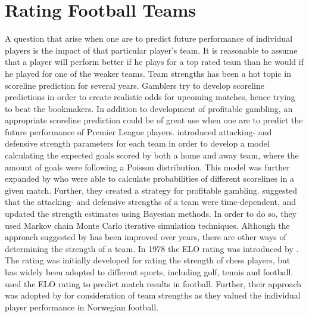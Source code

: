 \section{Rating Football Teams} \label{Strength_of_football_teams} 
\newpar
A question that arise when one are to predict future performance of individual players is the impact of that particular player's team. It is reasonable to assume that a player will perform better if he plays for a top rated team than he would if he played for one of the weaker teams. Team strengths has been a hot topic in scoreline prediction for several years. Gamblers try to develop scoreline predictions in order to create realistic odds for upcoming matches, hence trying to beat the bookmakers. In addition to development of profitable gambling, an appropriate scoreline prediction could be of great use when one are to predict the future performance of Premier League players. 
\newpar
\cite{Maher} introduced attacking- and defensive strength parameters for each team in order to develop a model calculating the expected goals scored by both a home and away team, where the amount of goals were following a Poisson distribution. This model was further expanded by \cite{Dixon} who were able to calculate probabilities of different scorelines in a given match. Further, they created a strategy for profitable gambling. \cite{Rue} suggested that the attacking- and defensive strengths of a team were time-dependent, and updated the strength estimates using Bayesian methods. In order to do so, they used Markov chain Monte Carlo iterative simulation techniques. 
\newpar
Although the approach suggested by \cite{Maher} has been improved over years, there are other ways of determining the strength of a team. In 1978 the ELO rating was introduced by \cite{Elo}. The rating was initially developed for rating the strength of chess players, but has widely been adopted to different sports, including golf, tennis and football. \cite{Hvattum} used the ELO rating to predict match results in football. Further, their approach was adopted by \cite{vabo} for consideration of team strengths as they valued the individual player performance in Norwegian football. 


